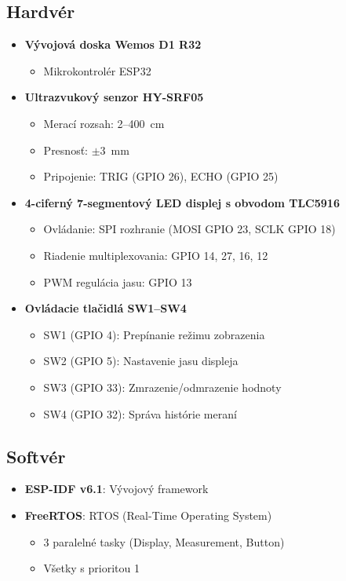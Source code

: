 \documentclass[a4paper, 11pt]{article}
\begin{document}
\subsection{Hardvér}
\begin{itemize}
    \item \textbf{Vývojová doska Wemos D1 R32}
    \begin{itemize}
        \item Mikrokontrolér ESP32
    \end{itemize}
    
    \item \textbf{Ultrazvukový senzor HY-SRF05}
    \begin{itemize}
        \item Merací rozsah: 2--400~cm
        \item Presnosť: $\pm$3~mm
        \item Pripojenie: TRIG (GPIO 26), ECHO (GPIO 25)
    \end{itemize}
    
    \item \textbf{4-ciferný 7-segmentový LED displej s obvodom TLC5916}
    \begin{itemize}
        \item Ovládanie: SPI rozhranie (MOSI GPIO 23, SCLK GPIO 18)
        \item Riadenie multiplexovania: GPIO 14, 27, 16, 12
        \item PWM regulácia jasu: GPIO 13
    \end{itemize}
    
    \item \textbf{Ovládacie tlačidlá SW1--SW4}
    \begin{itemize}
        \item SW1 (GPIO 4): Prepínanie režimu zobrazenia
        \item SW2 (GPIO 5): Nastavenie jasu displeja
        \item SW3 (GPIO 33): Zmrazenie/odmrazenie hodnoty
        \item SW4 (GPIO 32): Správa histórie meraní
    \end{itemize}
\end{itemize}
\subsection{Softvér}
\begin{itemize}
    \item \textbf{ESP-IDF v6.1}: Vývojový framework
    \item \textbf{FreeRTOS}: RTOS (Real-Time Operating System)
    \begin{itemize}
        \item 3 paralelné tasky (Display, Measurement, Button)
        \item Všetky s prioritou 1
    \end{itemize}
\end{itemize}
\end{document}
